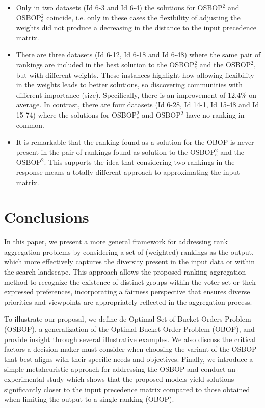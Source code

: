 \documentclass[preprint,12pt]{article}
\theoremstyle{definition}
\theoremstyle{remark}
\theoremstyle{example} %
\begin{document}
\begin{itemize}
    \item Only in two datasets (Id 6-3 and Id 6-4) the solutions  for OSBOP$^2$ and  OSBOP$^2_e$ coincide, i.e. only in these cases the flexibility of adjusting the weights did not produce a decreasing in the distance to the input precedence matrix.  
    \item There are three datasets (Id 6-12, Id 6-18 and Id 6-48) where the same pair of rankings are included in the best solution  to the OSBOP$^2_e$ and the OSBOP$^2$, but with different weights. These instances highlight how allowing flexibility in the weights leads to better solutions, so discovering communities with different importance (size). Specifically, there is an improvement of  12,4\% on average. In contrast, there are four datasets (Id 6-28, Id 14-1, Id 15-48 and Id 15-74) where the solutions for OSBOP$^2_e$ and OSBOP$^2$ have no ranking in common.
    \item It is  remarkable that the ranking found as a solution for the OBOP is never present in the pair of rankings 
 found as solution to the OSBOP$^2_e$ and the OSBOP$^2$. This supports the idea that considering two rankings in the response means a totally different approach to approximating the input matrix. 
    
\end{itemize}


\section{Conclusions}\label{sec:conclusions}

In this paper, we present a more general framework for addressing rank aggregation problems by considering a set of (weighted) rankings as the output, which more effectively captures the diversity present in the input data or within the search landscape. This approach allows the proposed ranking aggregation method to recognize the existence of distinct groups within the voter set or their expressed preferences, incorporating a fairness perspective that ensures diverse priorities and viewpoints are appropriately reflected in the aggregation process.

To illustrate our proposal, we define de Optimal Set of Bucket Orders Problem (OSBOP), a generalization of the Optimal Bucket Order Problem (OBOP), and provide insight through several illustrative examples. We also discuss the critical factors a decision maker must consider when choosing the variant of the OSBOP that best aligns with their specific needs and objectives. Finally, we introduce a simple metaheuristic approach for addressing the OSBOP and conduct an experimental study which shows that the proposed models yield solutions significantly closer to the input precedence matrix compared to those obtained when limiting the output to a single ranking (OBOP).
\end{document}
